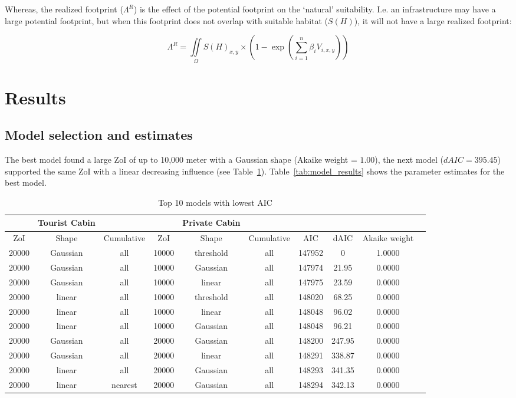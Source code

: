 \documentclass{article}
\begin{document}
Whereas, the realized footprint ($\Lambda^R$) is the effect of the potential footprint on the `natural' suitability. I.e. an infrastructure may have a large potential footprint, but when this footprint does not overlap with suitable habitat ($S(H)$), it will not have a large realized footprint:

\begin{equation}
    \Lambda^R = \iint\limits_{\Omega} S(H)_{x,y} \times (1 - \exp(\sum_{i=1}^n \beta_i V_{i,x,y}))
\end{equation}


\section{Results}

\subsection{Model selection and estimates}

The best model found a large ZoI of up to 10,000 meter with a Gaussian shape (Akaike weight = $1.00$), the next model ($dAIC = 395.45$) supported the same ZoI with a linear decreasing influence (see Table~\ref{tab:selection_results}). Table~\ref{tab:model_results} shows the parameter estimates for the best model. 

\begin{table}[ht]
\caption{Top 10 models with lowest AIC}
\label{tab:selection_results} %
\centering
\begin{tabular}{cccccccccc}
  \hline
 & Tourist Cabin & & & Private Cabin & & & &  \\ 
  \hline
ZoI & Shape & Cumulative & ZoI & Shape & Cumulative & AIC & dAIC & Akaike weight \\ 
\hline
20000 & Gaussian & all & 10000 & threshold & all & 147952 & 0 & 1.0000 \\ 
20000 & Gaussian & all & 10000 & Gaussian & all & 147974 & 21.95 & 0.0000 \\ 
20000 & Gaussian & all & 10000 & linear & all & 147975 & 23.59 & 0.0000 \\ 
20000 & linear & all & 10000 & threshold & all & 148020 & 68.25 & 0.0000 \\ 
20000 & linear & all & 10000 & linear & all & 148048 & 96.02 & 0.0000 \\ 
20000 & linear & all & 10000 & Gaussian & all & 148048 & 96.21 & 0.0000 \\ 
20000 & Gaussian & all & 20000 & Gaussian & all & 148200 & 247.95 & 0.0000 \\ 
20000 & Gaussian & all & 20000 & linear & all & 148291 & 338.87 & 0.0000 \\ 
20000 & linear & all & 20000 & Gaussian & all & 148293 & 341.35 & 0.0000 \\ 
20000 & linear & nearest & 20000 & Gaussian & all & 148294 & 342.13 & 0.0000 \\ 
   \hline
\end{tabular}
\end{table}
\end{document}
